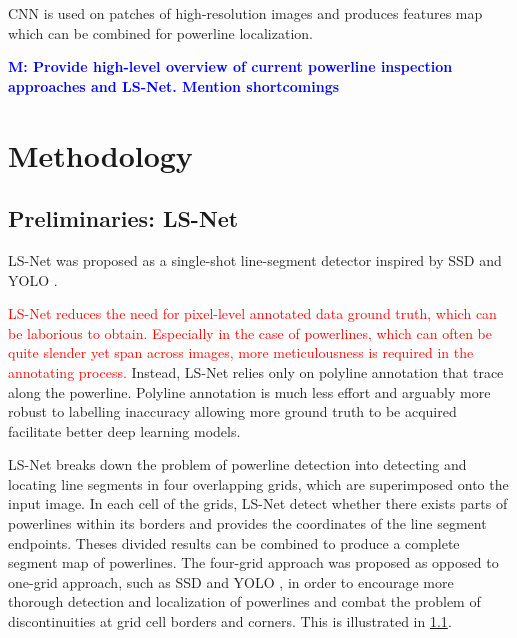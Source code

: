 \documentclass[journal]{IEEEtran}
\newcommand{\commentM}[1]{\textbf{\textcolor{blue}{M: #1}}}
\begin{document}
CNN is used on patches of high-resolution images and produces features map which can be combined for powerline localization. 

\commentM{Provide high-level overview of current powerline inspection approaches and LS-Net. Mention shortcomings}

\section{Methodology}

\subsection{Preliminaries: LS-Net}
LS-Net \cite{Nguyen2020} was proposed as a single-shot line-segment detector inspired by SSD \cite{SSD} and YOLO \cite{YOLO}. 

\textcolor{red}{LS-Net reduces the need for pixel-level annotated data ground truth, which can be laborious to obtain. Especially in the case of powerlines, which can often be quite slender yet span across images, more meticulousness is required in the annotating process.} Instead, LS-Net relies only on polyline annotation that trace along the powerline. Polyline annotation is much less effort and arguably more robust to labelling inaccuracy allowing more ground truth to be acquired facilitate better deep learning models. 

LS-Net breaks down the problem of powerline detection into detecting and locating line segments in four overlapping grids, which are superimposed onto the input image. In each cell of the grids,  LS-Net detect whether there exists parts of powerlines within its borders and provides the coordinates of the line segment endpoints. Theses divided results can be combined to produce a complete segment map of powerlines. The four-grid approach was proposed as opposed to one-grid approach, such as SSD \cite{SSD} and YOLO \cite{YOLO}, in order to encourage more thorough detection and localization of powerlines and combat the problem of discontinuities at grid cell borders and corners. This is illustrated in \ref{}. 
\end{document}
